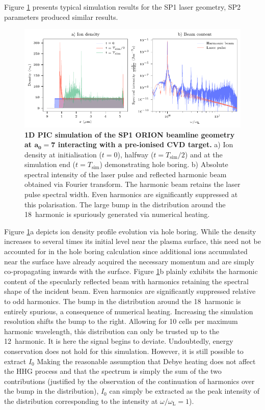 Figure \ref{fig:orionsimfigs} presents typical simulation results for the SP1 laser geometry, SP2 parameters produced similar results.
\begin{figure}
	\centering
	\includegraphics{figures/orion/orion_sim_figs}
	\caption[Typical 1D HHG Smilei simulation results]{\textbf{1D PIC simulation of the SP1 ORION beamline geometry at $\mathbf{a_0 = 7}$ interacting with a pre-ionised CVD target.} a) Ion density at initialisation ($t=0$), halfway ($t=T_\mathrm{sim}/2$) and at the simulation end ($t=T_\mathrm{sim}$) demonstrating hole boring. b) Absolute spectral intensity of the laser pulse and reflected harmonic beam obtained via Fourier transform. The harmonic beam retains the laser pulse spectral width. Even harmonics are significantly suppressed at this polarisation. The large bump in the distribution around the 18\th\ harmonic is spuriously generated via numerical heating.}
	\label{fig:orionsimfigs}
\end{figure}
Figure \ref{fig:orionsimfigs}a depicts ion density profile evolution via hole boring. While the density increases to several times its initial level near the plasma surface, this need not be accounted for in the hole boring calculation since additional ions accumulated near the surface have already acquired the necessary momentum and are simply co-propagating inwards with the surface. Figure \ref{fig:orionsimfigs}b plainly exhibits the harmonic content of the specularly reflected beam with harmonics retaining the spectral shape of the incident beam. Even harmonics are significantly suppressed relative to odd harmonics. The bump in the distribution around the 18\th\ harmonic is entirely spurious, a consequence of numerical heating. Increasing the simulation resolution shifts the bump to the right. Allowing for 10 cells per maximum harmonic wavelength, this distribution can only be trusted up to the 12\th\ harmonic. It is here the signal begins to deviate. Undoubtedly, energy conservation does not hold for this simulation. However, it is still possible to extract $I_0$
Making the reasonable assumption that Debye heating does not affect the HHG process and that the spectrum is simply the sum of the two contributions (justified by the observation of the continuation of harmonics over the bump in the distribution), $I_0$ can simply be extracted as the peak intensity of the distribution corresponding to the intensity at $\omega/\omega_\mathrm{L} = 1$).

